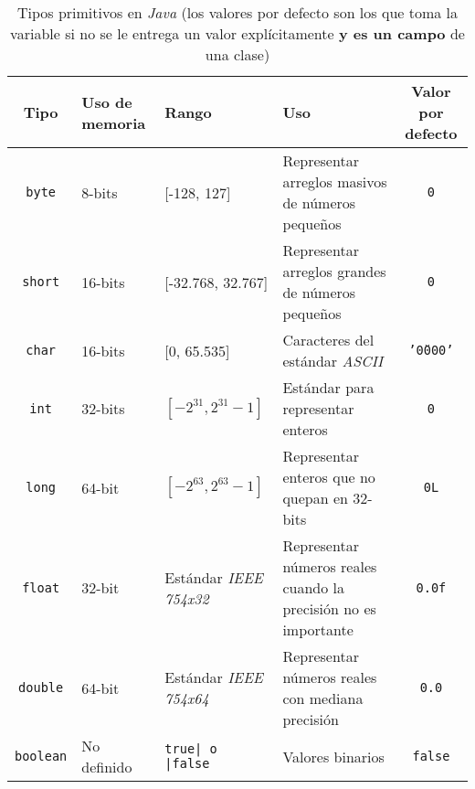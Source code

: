    \begin{table}[ht!]
      \centering
      \begin{tabular}{| c | m{5em} | m{6em} | m{12em} | c |}
        \hline
        Tipo                      & Uso de memoria  & Rango 
          & Uso                                               
          & Valor por defecto           \\
        \hline\hline
        \texttt{byte}     & 8-bits          & [-128, 127]  
          & Representar arreglos masivos de números pequeños  
          & \texttt{0}        \\\hline
        \texttt{short}    & 16-bits         & [-32.768, 32.767]
          & Representar arreglos grandes de números pequeños  
          & \texttt{0}        \\\hline
        \texttt{char}     & 16-bits         & [0, 65.535]
          & Caracteres del estándar \textit{ASCII}            
          & \texttt{'\u0000'} \\\hline
        \texttt{int}      & 32-bits         & \([-2^{31}, 2^{31} - 1]\)
          & Estándar para representar enteros               
          & \texttt{0}        \\\hline
        \texttt{long}     & 64-bit          & \([-2^{63}, 2^{63} - 1]\)
          & Representar enteros que no quepan en 32-bits
          & \texttt{0L}       \\\hline
        \texttt{float}    & 32-bit          & Estándar \textit{IEEE 754x32}
          & Representar números reales cuando la precisión no es importante
          & \texttt{0.0f}     \\\hline
        \texttt{double}   & 64-bit          & Estándar \textit{IEEE 754x64}
          & Representar números reales con mediana precisión
          & \texttt{0.0}      \\\hline
        \texttt{boolean}  & No definido     & \texttt{true| o |false}
          & Valores binarios
          & \texttt{false}    \\
        \hline
      \end{tabular}
      \caption{
        Tipos primitivos en \textit{Java} (los valores por defecto son los que toma la
        variable si no se le entrega un valor explícitamente \textbf{y es un campo} de una
        clase)
      }
      \label{tab:primitive}
    \end{table}


